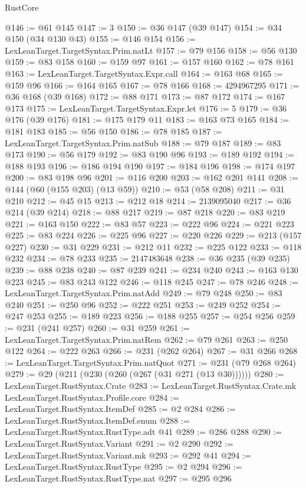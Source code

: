 \begin{lexlean}{RustCore}
\begin{coremodule}
@146 := @61 @145
@147 := 3
@150 := @36 @147 (@39 @147)
@154 := @34 @150 (@34 @130 @43)
@155 := @146 @154
@156 := LexLeanTarget.TargetSyntax.Prim.natLt
@157 := @79 @156
@158 := @56 @130
@159 := @83 @158
@160 := @159 @97
@161 := @157 @160
@162 := @78 @161
@163 := LexLeanTarget.TargetSyntax.Expr.call
@164 := @163 @68
@165 := @159 @96
@166 := @164 @165
@167 := @78 @166
@168 := 4294967295
@171 := @36 @168 (@39 @168)
@172 := @88 @171
@173 := @87 @172
@174 := @167 @173
@175 := LexLeanTarget.TargetSyntax.Expr.let
@176 := 5
@179 := @36 @176 (@39 @176)
@181 := @175 @179 @11
@183 := @163 @73 @165
@184 := @181 @183
@185 := @56 @150
@186 := @78 @185
@187 := LexLeanTarget.TargetSyntax.Prim.natSub
@188 := @79 @187
@189 := @83 @173
@190 := @56 @179
@192 := @83 @190 @96
@193 := @189 @192
@194 := @188 @193
@196 := @186 @194 @190
@197 := @184 @196
@198 := @174 @197
@200 := @83 @198 @96
@201 := @116 @200
@203 := @162 @201 @141
@208 := @144 (@60 (@155 @203) (@13 @59))
@210 := @53 (@58 @208)
@211 := @31 @210
@212 := @45 @15
@213 := @212 @18
@214 := 2139095040
@217 := @36 @214 (@39 @214)
@218 := @88 @217
@219 := @87 @218
@220 := @83 @219
@221 := @163 @150
@222 := @83 @57
@223 := @222 @96
@224 := @221 @223
@225 := @83 @224
@226 := @225 @96
@227 := @220 @226
@229 := @213 (@157 @227)
@230 := @31 @229
@231 := @212 @11
@232 := @225 @122
@233 := @118 @232
@234 := @78 @233
@235 := 2147483648
@238 := @36 @235 (@39 @235)
@239 := @88 @238
@240 := @87 @239
@241 := @234 @240
@243 := @163 @130 @223
@245 := @83 @243 @122
@246 := @118 @245
@247 := @78 @246
@248 := LexLeanTarget.TargetSyntax.Prim.natAdd
@249 := @79 @248
@250 := @83 @240
@251 := @250 @96
@252 := @222 @251
@253 := @249 @252
@254 := @247 @253
@255 := @189 @223
@256 := @188 @255
@257 := @254 @256
@259 := @231 (@241 @257)
@260 := @31 @259
@261 := LexLeanTarget.TargetSyntax.Prim.natRem
@262 := @79 @261
@263 := @250 @122
@264 := @222 @263
@266 := @231 (@262 @264)
@267 := @31 @266
@268 := LexLeanTarget.TargetSyntax.Prim.natQuot
@271 := @231 (@79 @268 @264)
@279 := @29 (@211 (@230 (@260 (@267 (@31 @271 (@13 @30))))))
@280 := LexLeanTarget.RustSyntax.Crate
@283 := LexLeanTarget.RustSyntax.Crate.mk LexLeanTarget.RustSyntax.Profile.core
@284 := LexLeanTarget.RustSyntax.ItemDef
@285 := @2 @284
@286 := LexLeanTarget.RustSyntax.ItemDef.enum
@288 := LexLeanTarget.RustSyntax.RustType.adt @41
@289 := @286 @288
@290 := LexLeanTarget.RustSyntax.Variant
@291 := @2 @290
@292 := LexLeanTarget.RustSyntax.Variant.mk
@293 := @292 @41
@294 := LexLeanTarget.RustSyntax.RustType
@295 := @2 @294
@296 := LexLeanTarget.RustSyntax.RustType.nat
@297 := @295 @296

\end{coremodule}
\end{lexlean}
